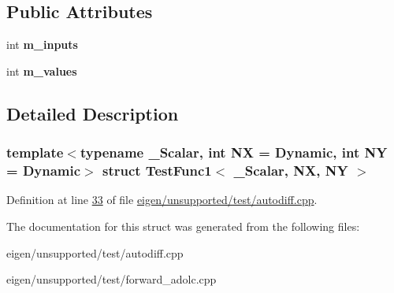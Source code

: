 \subsection*{Public Attributes}
\begin{DoxyCompactItemize}
\item 
\mbox{\label{struct_test_func1_a080bed052ead2628c1df91a4cf54db9c}} 
int {\bfseries m\+\_\+inputs}
\item 
\mbox{\label{struct_test_func1_ae619325a8ef8c86a2d8cd8705a484bcb}} 
int {\bfseries m\+\_\+values}
\end{DoxyCompactItemize}


\subsection{Detailed Description}
\subsubsection*{template$<$typename \+\_\+\+Scalar, int NX = Dynamic, int NY = Dynamic$>$\newline
struct Test\+Func1$<$ \+\_\+\+Scalar, N\+X, N\+Y $>$}



Definition at line \hyperlink{eigen_2unsupported_2test_2autodiff_8cpp_source_l00033}{33} of file \hyperlink{eigen_2unsupported_2test_2autodiff_8cpp_source}{eigen/unsupported/test/autodiff.\+cpp}.



The documentation for this struct was generated from the following files\+:\begin{DoxyCompactItemize}
\item 
eigen/unsupported/test/autodiff.\+cpp\item 
eigen/unsupported/test/forward\+\_\+adolc.\+cpp\end{DoxyCompactItemize}
